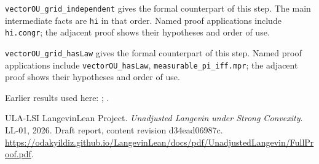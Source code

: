 \documentclass[11pt,a4paper]{article}
\begin{document}
\begin{leanbox}
\texttt{vector\allowbreak{}OU\_\allowbreak{}grid\_\allowbreak{}independent} gives the formal counterpart of this step. The main intermediate facts are \texttt{hi} in that order. Named proof applications include \texttt{hi.\allowbreak{}congr}; the adjacent proof shows their hypotheses and order of use.




\texttt{vector\allowbreak{}OU\_\allowbreak{}grid\_\allowbreak{}has\allowbreak{}Law} gives the formal counterpart of this step. Named proof applications include \texttt{vector\allowbreak{}OU\_\allowbreak{}has\allowbreak{}Law}, \texttt{measurable\_\allowbreak{}pi\_\allowbreak{}iff.\allowbreak{}mpr}; the adjacent proof shows their hypotheses and order of use.
\end{leanbox}


Earlier results used here: \cite[Section~3.8.16]{LangevinLean2026ULASC}; \cite[Section~3.8.17]{LangevinLean2026ULASC}.

\begin{thebibliography}{ULA-LSI}
LangevinLean Project. \emph{Unadjusted Langevin under Strong Convexity}. LL-01, 2026. Draft report, content revision d34ead06987c. \url{https://odakyildiz.github.io/LangevinLean/docs/pdf/UnadjustedLangevin/FullProof.pdf}.
\end{thebibliography}
\end{document}
